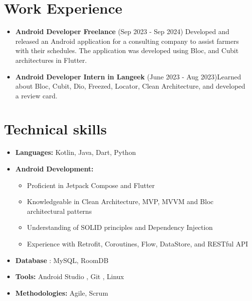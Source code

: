 \documentclass[a4paper,12pt]{article} %
\begin{document}
\vspace{0.5cm}

\section{Work Experience}
\vspace{0.2cm}

\begin{itemize}
    \item \textbf{Android Developer Freelance } (Sep 2023 - Sep 2024) \newline
    Developed and released an Android application for a consulting company to assist farmers with their schedules. The application was developed using Bloc, and Cubit architectures in Flutter. 
    \vspace{0.5cm}
    \item \textbf{Android Developer Intern in Langeek} (June 2023 - Aug 2023)\newline Learned about Bloc, Cubit, Dio, Freezed, Locator, Clean Architecture, and developed a review card.
\end{itemize}

\vspace{0.5cm}

\section{Technical skills} 

\begin{itemize}
    \item \textbf{Languages: }Kotlin, Java, Dart, Python
    \vspace{0.2cm}
    \item \textbf{Android Development:} 
        \begin{itemize}
            \vspace{0.1cm}
            \item Proficient in Jetpack Compose and Flutter
            \vspace{0.1cm}
            \item Knowledgeable in Clean Architecture, MVP, MVVM and Bloc architectural patterns
            \item Understanding of SOLID principles and Dependency Injection
            \vspace{0.1cm}
            \item Experience with Retrofit, Coroutines, Flow, DataStore, and RESTful API
            \vspace{0.1cm}
        \end{itemize}
        \vspace{0.2cm}
    \item \textbf{Database} : MySQL, RoomDB
    \vspace{0.2cm}
    \item \textbf{Tools: }Android Studio , Git , Linux
    \vspace{0.2cm}
    \item \textbf{Methodologies: }Agile, Scrum
\end{itemize}
\vspace{0.5cm}
\end{document}
